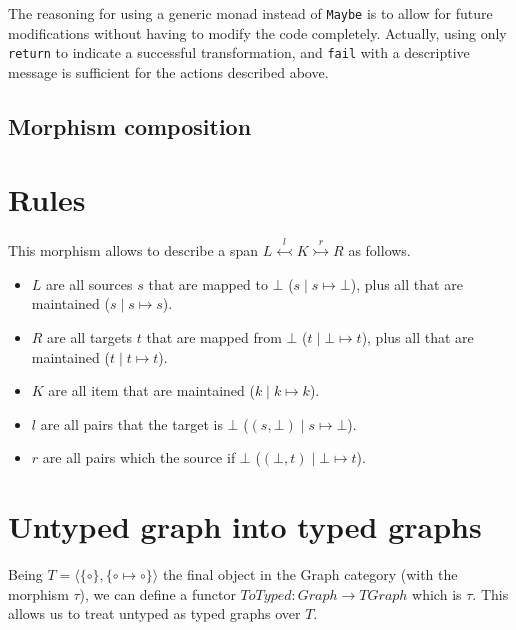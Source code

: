 \documentclass[a4paper]{report}
\begin{document}
The reasoning for using a generic monad instead of \texttt{Maybe} is to allow for future modifications without having to modify the code completely. Actually, using only \texttt{return} to indicate a successful transformation, and \texttt{fail} with a descriptive message is sufficient for the actions described above.

\subsection{Morphism composition}


\section{Rules}
This morphism allows to describe a span $L \overset{l}{\leftarrowtail} K \overset{r}{\rightarrowtail} R$ as follows.

\begin{itemize}
	\item $L$ are all sources $s$ that are mapped to $\bot$ ($s \mid s \mapsto \bot$), plus all that are maintained ($s \mid s \mapsto s$).
	\item $R$ are all targets $t$ that are mapped from $\bot$ ($t \mid \bot \mapsto t$), plus all that are maintained ($t \mid t \mapsto t$).
	\item $K$ are all item that are maintained ($k \mid k \mapsto k$).
	\item $l$ are all pairs that the target is $\bot$ ($(s, \bot) \mid s \mapsto \bot$).
	\item $r$ are all pairs which the source if $\bot$ ($(\bot, t) \mid \bot \mapsto t$).
\end{itemize}

\section{Untyped graph into typed graphs}
Being $T = \langle\{\circ\}, \{\circ \mapsto \circ\}\rangle$ the final object in the Graph category (with the morphism $\tau$), we can define a functor $ToTyped: Graph \to TGraph$ which is $\tau$. This allows us to treat untyped as typed graphs over $T$.
\end{document}
